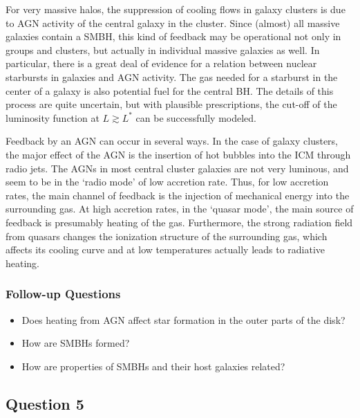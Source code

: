 \documentclass[a4paper,10pt]{article}
\begin{document}
{\noindent}For very massive halos, the suppression of cooling flows in galaxy clusters is due to AGN activity of the central galaxy in the cluster. Since (almost) all massive galaxies contain a SMBH, this kind of feedback may be operational not only in groups and clusters, but actually in individual massive galaxies as well. In particular, there is a great deal of evidence for a relation between nuclear starbursts in galaxies and AGN activity. The gas needed for a starburst in the center of a galaxy is also potential fuel for the central BH. The details of this process are quite uncertain, but with plausible prescriptions, the cut-off of the luminosity function at $L\gtrsim L^*$ can be successfully modeled.

{\noindent}Feedback by an AGN can occur in several ways. In the case of galaxy clusters, the major effect of the AGN is the insertion of hot bubbles into the ICM through radio jets. The AGNs in most central cluster galaxies are not very luminous, and seem to be in the `radio mode' of low accretion rate. Thus, for low accretion rates, the main channel of feedback is the injection of mechanical energy into the surrounding gas. At high accretion rates, in the `quasar mode', the main source of feedback is presumably heating of the gas. Furthermore, the strong radiation field from quasars changes the ionization structure of the surrounding gas, which affects its cooling curve and at low temperatures actually leads to radiative heating.

\subsubsection{Follow-up Questions}

\begin{itemize}
    \item Does heating from AGN affect star formation in the outer parts of the disk?
    \item How are SMBHs formed?
    \item How are properties of SMBHs and their host galaxies related?
\end{itemize}


\clearpage
\subsection{Question 5}
\end{document}
